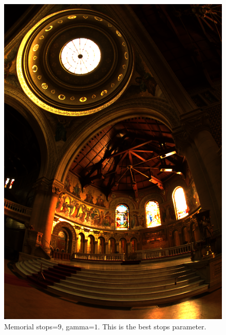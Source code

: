 \documentclass[a4paper,12pt,oneside,final]{report}
\begin{document}
\begin{figure}[!h]
\centering
\includegraphics[scale=0.8]{pictures/stops_9_gamma_1.png}
\caption{Memorial stops=$9$, gamma=$1$. This is the best stops parameter.}
\end{figure}
\end{document}
